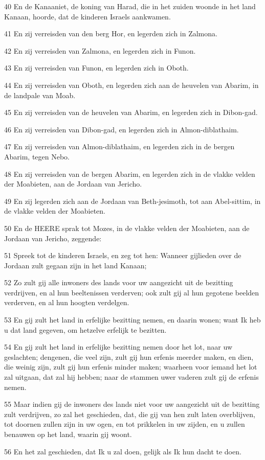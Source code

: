 \par 40 En de Kanaaniet, de koning van Harad, die in het zuiden woonde in het land Kanaan, hoorde, dat de kinderen Israels aankwamen.
\par 41 En zij verreisden van den berg Hor, en legerden zich in Zalmona.
\par 42 En zij verreisden van Zalmona, en legerden zich in Funon.
\par 43 En zij verreisden van Funon, en legerden zich in Oboth.
\par 44 En zij verreisden van Oboth, en legerden zich aan de heuvelen van Abarim, in de landpale van Moab.
\par 45 En zij verreisden van de heuvelen van Abarim, en legerden zich in Dibon-gad.
\par 46 En zij verreisden van Dibon-gad, en legerden zich in Almon-diblathaim.
\par 47 En zij verreisden van Almon-diblathaim, en legerden zich in de bergen Abarim, tegen Nebo.
\par 48 En zij verreisden van de bergen Abarim, en legerden zich in de vlakke velden der Moabieten, aan de Jordaan van Jericho.
\par 49 En zij legerden zich aan de Jordaan van Beth-jesimoth, tot aan Abel-sittim, in de vlakke velden der Moabieten.
\par 50 En de HEERE sprak tot Mozes, in de vlakke velden der Moabieten, aan de Jordaan van Jericho, zeggende:
\par 51 Spreek tot de kinderen Israels, en zeg tot hen: Wanneer gijlieden over de Jordaan zult gegaan zijn in het land Kanaan;
\par 52 Zo zult gij alle inwoners des lands voor uw aangezicht uit de bezitting verdrijven, en al hun beeltenissen verderven; ook zult gij al hun gegotene beelden verderven, en al hun hoogten verdelgen.
\par 53 En gij zult het land in erfelijke bezitting nemen, en daarin wonen; want Ik heb u dat land gegeven, om hetzelve erfelijk te bezitten.
\par 54 En gij zult het land in erfelijke bezitting nemen door het lot, naar uw geslachten; dengenen, die veel zijn, zult gij hun erfenis meerder maken, en dien, die weinig zijn, zult gij hun erfenis minder maken; waarheen voor iemand het lot zal uitgaan, dat zal hij hebben; naar de stammen uwer vaderen zult gij de erfenis nemen.
\par 55 Maar indien gij de inwoners des lands niet voor uw aangezicht uit de bezitting zult verdrijven, zo zal het geschieden, dat, die gij van hen zult laten overblijven, tot doornen zullen zijn in uw ogen, en tot prikkelen in uw zijden, en u zullen benauwen op het land, waarin gij woont.
\par 56 En het zal geschieden, dat Ik u zal doen, gelijk als Ik hun dacht te doen.

